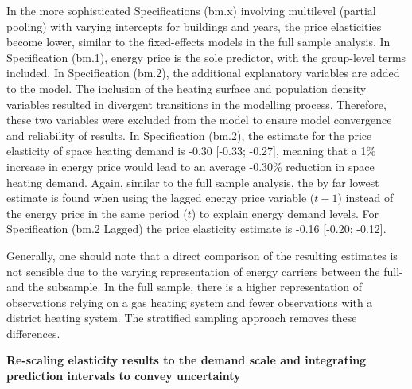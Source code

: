 \documentclass[12pt,twoside]{reedthesis}
\begin{document}
In the more sophisticated Specifications (bm.x) involving multilevel (partial pooling) with varying intercepts for buildings and years, the price elasticities become lower, similar to the fixed-effects models in the full sample analysis. In Specification (bm.1), energy price is the sole predictor, with the group-level terms included. In Specification (bm.2), the additional explanatory variables are added to the model. The inclusion of the heating surface and population density variables resulted in divergent transitions in the modelling process. Therefore, these two variables were excluded from the model to ensure model convergence and reliability of results. In Specification (bm.2), the estimate for the price elasticity of space heating demand is -0.30 {[}-0.33; -0.27{]}, meaning that a 1\% increase in energy price would lead to an average -0.30\% reduction in space heating demand. Again, similar to the full sample analysis, the by far lowest estimate is found when using the lagged energy price variable (\(t-1\)) instead of the energy price in the same period (\(t\)) to explain energy demand levels. For Specification (bm.2 Lagged) the price elasticity estimate is -0.16 {[}-0.20; -0.12{]}.

Generally, one should note that a direct comparison of the resulting estimates is not sensible due to the varying representation of energy carriers between the full- and the subsample. In the full sample, there is a higher representation of observations relying on a gas heating system and fewer observations with a district heating system. The stratified sampling approach removes these differences.

\textbf{Re-scaling elasticity results to the demand scale and integrating prediction intervals to convey uncertainty}
\end{document}
